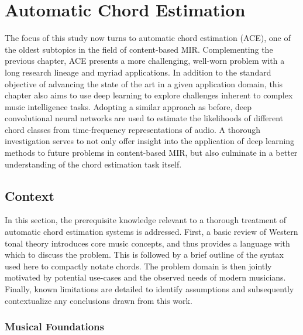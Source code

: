 \graphicspath{{5/figures/}}

\chapter{Automatic Chord Estimation}
\label{chp:chord_estimation}

The focus of this study now turns to automatic chord estimation (ACE), one of the oldest subtopics in the field of content-based MIR.
Complementing the previous chapter, ACE presents a more challenging, well-worn problem with a long research lineage and myriad applications.
In addition to the standard objective of advancing the state of the art in a given application domain, this chapter also aims to use deep learning to explore challenges inherent to complex music intelligence tasks.
Adopting a similar approach as before, deep convolutional neural networks are used to estimate the likelihoods of different chord classes from time-frequency representations of audio.
A thorough investigation serves to not only offer insight into the application of deep learning methods to future problems in content-based MIR, but also culminate in a better understanding of the chord estimation task itself.

\section{Context}
\label{sec:context}

In this section, the prerequisite knowledge relevant to a thorough treatment of automatic chord estimation systems is addressed.
First, a basic review of Western tonal theory introduces core music concepts, and thus provides a language with which to discuss the problem.
This is followed by a brief outline of the syntax used here to compactly notate chords.
The problem domain is then jointly motivated by potential use-cases and the observed needs of modern musicians.
Finally, known limitations are detailed to identify assumptions and subsequently contextualize any conclusions drawn from this work.



\subsection{Musical Foundations}
\label{subsec:musical_foundations}


